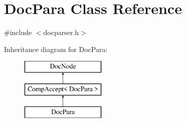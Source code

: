 \hypertarget{class_doc_para}{}\section{Doc\+Para Class Reference}
\label{class_doc_para}


{\ttfamily \#include $<$docparser.\+h$>$}

Inheritance diagram for Doc\+Para\+:\begin{figure}[H]
\begin{center}
\leavevmode
\includegraphics[height=3.000000cm]{class_doc_para}
\end{center}
\end{figure}
